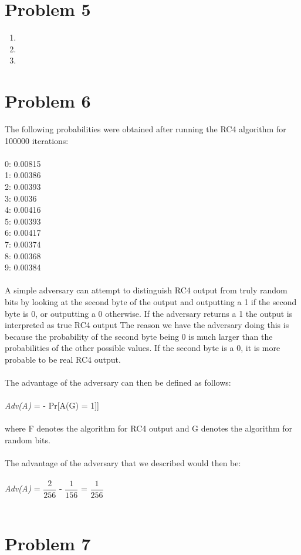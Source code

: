 \documentclass[paper=letter, fontsize=12pt]{article}
\title{
\normalfont \normalsize
\horrule{0.5pt} \\[0.3cm]
\huge Problem Set #1 \\
\horrule{0.5pt} \\[0.3cm]
}
\author{Andrew Kaufman \\ SID: 998048873}
\date{\normalsize\today}
\newcommand\tab[1][1cm]{\hspace*{#1}}
\begin{document}
\maketitle

\section*{Problem 5}
\begin{enumerate}[label=(\alph*)]
\item
\item
\item
\end{enumerate}

\section*{Problem 6}

The following probabilities were obtained after running the RC4 algorithm for 100000 iterations: \\ \\
\tab 0: 0.00815 \\
\tab 1: 0.00386 \\
\tab 2: 0.00393 \\
\tab 3: 0.0036 \\
\tab 4: 0.00416 \\
\tab 5: 0.00393 \\
\tab 6: 0.00417 \\
\tab 7: 0.00374 \\
\tab 8: 0.00368 \\
\tab 9: 0.00384 \\ \\
A simple adversary can attempt to distinguish RC4 output from truly random bits by looking at the second byte of the output
and outputting a 1 if the second byte is 0, or outputting a 0 otherwise. If the adversary returns a 1 the output is interpreted
as true RC4 output The reason we have the adversary doing this is because the probability of the second byte being 0 is much
larger than the probabilities of the other possible values. If the second byte is a 0, it is more probable to be real RC4 output. \\ \\
The advantage of the adversary can then be defined as follows: \\ \\
\tab \tab \textit{Adv(A)} = \big[Pr[A(F) = 1] - Pr[A(G) = 1]\big] \\ \\
where F denotes the algorithm for RC4 output and G denotes the algorithm for random bits. \\ \\
The advantage of the adversary that we described would then be: \\ \\
\tab \tab \textit{Adv(A)} = \(\dfrac{2}{256}\) - \(\dfrac{1}{156}\) = \(\dfrac{1}{256}\) \\ \\


\section*{Problem 7}
\end{document}
